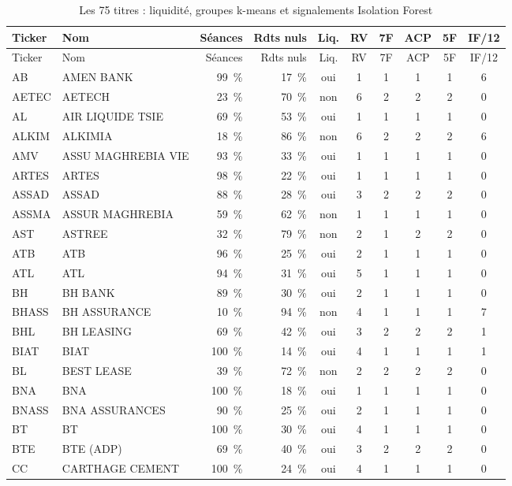 \begin{longtable}{llrrcccccc}
\caption{Les 75 titres : liquidité, groupes k-means et signalements Isolation Forest}\label{tab:annexe-titres}\\
\toprule Ticker & Nom & Séances & Rdts nuls & Liq. & RV & 7F & ACP & 5F & IF/12 \\ \midrule \endfirsthead
\toprule Ticker & Nom & Séances & Rdts nuls & Liq. & RV & 7F & ACP & 5F & IF/12 \\ \midrule \endhead \bottomrule \endfoot
AB & AMEN BANK & 99~\% & 17~\% & oui & 1 & 1 & 1 & 1 & 6 \\
AETEC & AETECH & 23~\% & 70~\% & non & 6 & 2 & 2 & 2 & 0 \\
AL & AIR LIQUIDE TSIE & 69~\% & 53~\% & oui & 1 & 1 & 1 & 1 & 0 \\
ALKIM & ALKIMIA & 18~\% & 86~\% & non & 6 & 2 & 2 & 2 & 6 \\
AMV & ASSU MAGHREBIA VIE & 93~\% & 33~\% & oui & 1 & 1 & 1 & 1 & 0 \\
ARTES & ARTES & 98~\% & 22~\% & oui & 1 & 1 & 1 & 1 & 0 \\
ASSAD & ASSAD & 88~\% & 28~\% & oui & 3 & 2 & 2 & 2 & 0 \\
ASSMA & ASSUR MAGHREBIA & 59~\% & 62~\% & non & 1 & 1 & 1 & 1 & 0 \\
AST & ASTREE & 32~\% & 79~\% & non & 2 & 1 & 2 & 2 & 0 \\
ATB & ATB & 96~\% & 25~\% & oui & 2 & 1 & 1 & 1 & 0 \\
ATL & ATL & 94~\% & 31~\% & oui & 5 & 1 & 1 & 1 & 0 \\
BH & BH BANK & 89~\% & 30~\% & oui & 2 & 1 & 1 & 1 & 0 \\
BHASS & BH ASSURANCE & 10~\% & 94~\% & non & 4 & 1 & 1 & 1 & 7 \\
BHL & BH LEASING & 69~\% & 42~\% & oui & 3 & 2 & 2 & 2 & 1 \\
BIAT & BIAT & 100~\% & 14~\% & oui & 4 & 1 & 1 & 1 & 1 \\
BL & BEST LEASE & 39~\% & 72~\% & non & 2 & 2 & 2 & 2 & 0 \\
BNA & BNA & 100~\% & 18~\% & oui & 1 & 1 & 1 & 1 & 0 \\
BNASS & BNA ASSURANCES & 90~\% & 25~\% & oui & 2 & 1 & 1 & 1 & 0 \\
BT & BT & 100~\% & 30~\% & oui & 4 & 1 & 1 & 1 & 0 \\
BTE & BTE (ADP) & 69~\% & 40~\% & oui & 3 & 2 & 2 & 2 & 0 \\
CC & CARTHAGE CEMENT & 100~\% & 24~\% & oui & 4 & 1 & 1 & 1 & 0 \\

\end{longtable}
